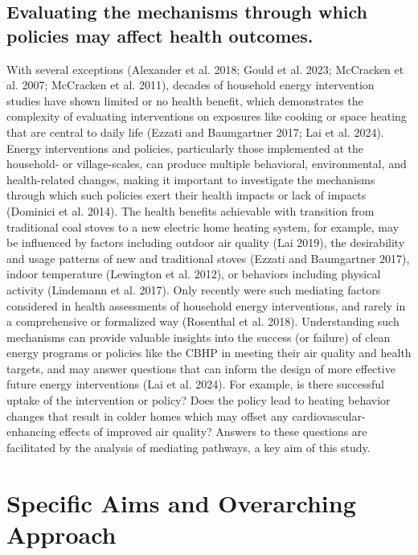 \documentclass[
  letterpaper,
  DIV=11,
  numbers=noendperiod]{scrartcl}
\begin{document}
\hypertarget{evaluating-the-mechanisms-through-which-policies-may-affect-health-outcomes.}{%
\subsection{Evaluating the mechanisms through which policies may affect
health
outcomes.}\label{evaluating-the-mechanisms-through-which-policies-may-affect-health-outcomes.}}

With several exceptions (Alexander et al. 2018; Gould et al. 2023;
McCracken et al. 2007; McCracken et al. 2011), decades of household
energy intervention studies have shown limited or no health benefit,
which demonstrates the complexity of evaluating interventions on
exposures like cooking or space heating that are central to daily life
(Ezzati and Baumgartner 2017; Lai et al. 2024). Energy interventions and
policies, particularly those implemented at the household- or
village-scales, can produce multiple behavioral, environmental, and
health-related changes, making it important to investigate the
mechanisms through which such policies exert their health impacts or
lack of impacts (Dominici et al. 2014). The health benefits achievable
with transition from traditional coal stoves to a new electric home
heating system, for example, may be influenced by factors including
outdoor air quality (Lai 2019), the desirability and usage patterns of
new and traditional stoves (Ezzati and Baumgartner 2017), indoor
temperature (Lewington et al. 2012), or behaviors including physical
activity (Lindemann et al. 2017). Only recently were such mediating
factors considered in health assessments of household energy
interventions, and rarely in a comprehensive or formalized way
(Rosenthal et al. 2018). Understanding such mechanisms can provide
valuable insights into the success (or failure) of clean energy programs
or policies like the CBHP in meeting their air quality and health
targets, and may answer questions that can inform the design of more
effective future energy interventions (Lai et al. 2024). For example, is
there successful uptake of the intervention or policy? Does the policy
lead to heating behavior changes that result in colder homes which may
offset any cardiovascular-enhancing effects of improved air quality?
Answers to these questions are facilitated by the analysis of mediating
pathways, a key aim of this study.

\hypertarget{specific-aims-and-overarching-approach}{%
\section{Specific Aims and Overarching
Approach}\label{specific-aims-and-overarching-approach}}
\end{document}
